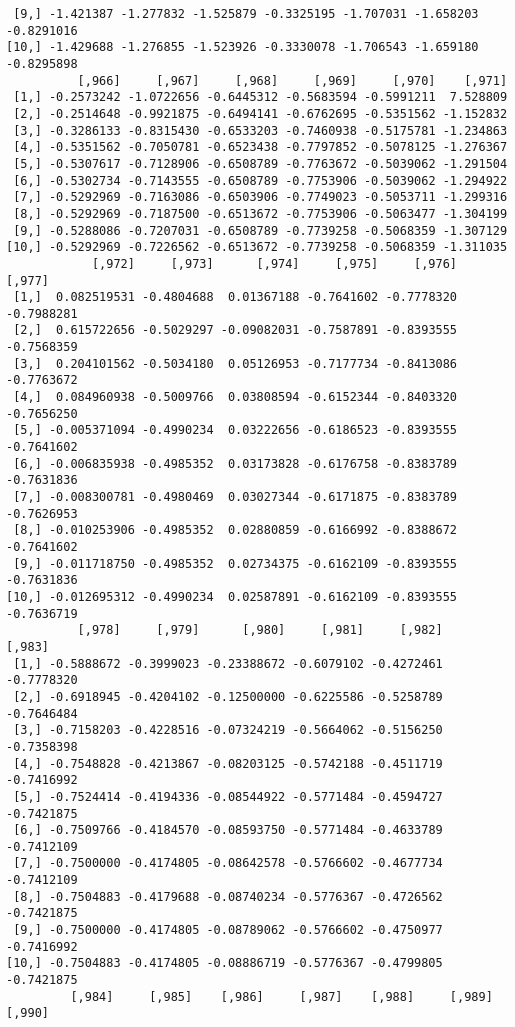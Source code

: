 \documentclass[
  letterpaper,
  DIV=11,
  numbers=noendperiod]{scrreprt}
\begin{document}
\begin{verbatim}
 [9,] -1.421387 -1.277832 -1.525879 -0.3325195 -1.707031 -1.658203 -0.8291016
[10,] -1.429688 -1.276855 -1.523926 -0.3330078 -1.706543 -1.659180 -0.8295898
          [,966]     [,967]     [,968]     [,969]     [,970]    [,971]
 [1,] -0.2573242 -1.0722656 -0.6445312 -0.5683594 -0.5991211  7.528809
 [2,] -0.2514648 -0.9921875 -0.6494141 -0.6762695 -0.5351562 -1.152832
 [3,] -0.3286133 -0.8315430 -0.6533203 -0.7460938 -0.5175781 -1.234863
 [4,] -0.5351562 -0.7050781 -0.6523438 -0.7797852 -0.5078125 -1.276367
 [5,] -0.5307617 -0.7128906 -0.6508789 -0.7763672 -0.5039062 -1.291504
 [6,] -0.5302734 -0.7143555 -0.6508789 -0.7753906 -0.5039062 -1.294922
 [7,] -0.5292969 -0.7163086 -0.6503906 -0.7749023 -0.5053711 -1.299316
 [8,] -0.5292969 -0.7187500 -0.6513672 -0.7753906 -0.5063477 -1.304199
 [9,] -0.5288086 -0.7207031 -0.6508789 -0.7739258 -0.5068359 -1.307129
[10,] -0.5292969 -0.7226562 -0.6513672 -0.7739258 -0.5068359 -1.311035
            [,972]     [,973]      [,974]     [,975]     [,976]     [,977]
 [1,]  0.082519531 -0.4804688  0.01367188 -0.7641602 -0.7778320 -0.7988281
 [2,]  0.615722656 -0.5029297 -0.09082031 -0.7587891 -0.8393555 -0.7568359
 [3,]  0.204101562 -0.5034180  0.05126953 -0.7177734 -0.8413086 -0.7763672
 [4,]  0.084960938 -0.5009766  0.03808594 -0.6152344 -0.8403320 -0.7656250
 [5,] -0.005371094 -0.4990234  0.03222656 -0.6186523 -0.8393555 -0.7641602
 [6,] -0.006835938 -0.4985352  0.03173828 -0.6176758 -0.8383789 -0.7631836
 [7,] -0.008300781 -0.4980469  0.03027344 -0.6171875 -0.8383789 -0.7626953
 [8,] -0.010253906 -0.4985352  0.02880859 -0.6166992 -0.8388672 -0.7641602
 [9,] -0.011718750 -0.4985352  0.02734375 -0.6162109 -0.8393555 -0.7631836
[10,] -0.012695312 -0.4990234  0.02587891 -0.6162109 -0.8393555 -0.7636719
          [,978]     [,979]      [,980]     [,981]     [,982]     [,983]
 [1,] -0.5888672 -0.3999023 -0.23388672 -0.6079102 -0.4272461 -0.7778320
 [2,] -0.6918945 -0.4204102 -0.12500000 -0.6225586 -0.5258789 -0.7646484
 [3,] -0.7158203 -0.4228516 -0.07324219 -0.5664062 -0.5156250 -0.7358398
 [4,] -0.7548828 -0.4213867 -0.08203125 -0.5742188 -0.4511719 -0.7416992
 [5,] -0.7524414 -0.4194336 -0.08544922 -0.5771484 -0.4594727 -0.7421875
 [6,] -0.7509766 -0.4184570 -0.08593750 -0.5771484 -0.4633789 -0.7412109
 [7,] -0.7500000 -0.4174805 -0.08642578 -0.5766602 -0.4677734 -0.7412109
 [8,] -0.7504883 -0.4179688 -0.08740234 -0.5776367 -0.4726562 -0.7421875
 [9,] -0.7500000 -0.4174805 -0.08789062 -0.5766602 -0.4750977 -0.7416992
[10,] -0.7504883 -0.4174805 -0.08886719 -0.5776367 -0.4799805 -0.7421875
         [,984]     [,985]    [,986]     [,987]    [,988]     [,989]     [,990]

\end{verbatim}
\end{document}
